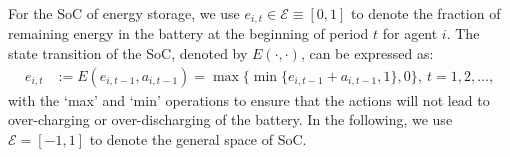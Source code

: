 \documentclass{article}
\theoremstyle{definition}
\theoremstyle{plain}
\begin{document}

For the SoC of energy storage, we use $e_{i,t} \in \mathcal{E} \equiv [0, 1]$ to denote the fraction of remaining energy in the battery at the beginning of period $t$ for agent $i$. The state transition of the SoC, denoted by $E(\cdot,\cdot)$, can be expressed as:
\begin{align}
e_{i,t} & :=  E(e_{i,t-1},a_{i,t-1})  = 
\max \{\min \{e_{i,t-1} + a_{i,t-1},1\}, 0\}, \ t = 1, 2, \ldots, \label{eq:StateTransition}
\end{align}
with the `max' and `min' operations to ensure that the actions will not lead to over-charging or over-discharging of the battery. In the following, we use $\mathcal{E} = [-1,1]$ to denote the general space of SoC. 
\end{document}
